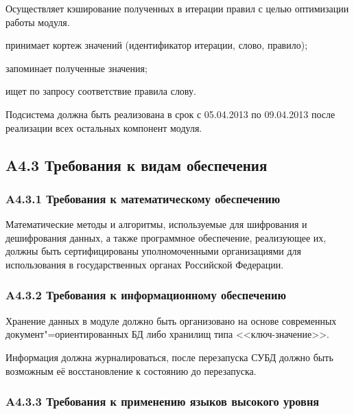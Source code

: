 Осуществляет кэширование полученных в итерации правил с целью оптимизации работы модуля.

\begin{list}{}{\leftmargin=1.5cm}
  \item принимает кортеж значений (идентификатор итерации, слово, правило);
  \item запоминает полученные значения;
  \item ищет по запросу соответствие правила слову.
\end{list}

Подсистема должна быть реализована в срок с 05.04.2013 по 09.04.2013 после реализации всех остальных компонент модуля.

\subsection*{A4.3 Требования к видам обеспечения}

\subsubsection*{A4.3.1 Требования к математическому обеспечению}

Математические методы и алгоритмы, используемые для шифрования и дешифрования
данных, а также программное обеспечение, реализующее их, должны быть
сертифицированы уполномоченными организациями для использования в
государственных органах Российской Федерации.

\subsubsection*{A4.3.2 Требования к информационному обеспечению}

Хранение данных в модуле должно быть организовано на основе современных
документ"=ориентированных БД либо хранилищ типа <<ключ-значение>>.

Информация должна журналироваться, после перезапуска СУБД должно быть возможным её восстановление к состоянию до перезапуска. 

\subsubsection*{A4.3.3 Требования к применению языков высокого уровня}

